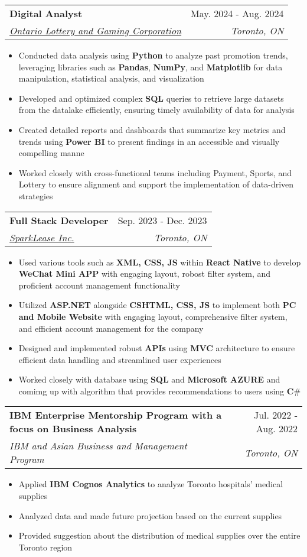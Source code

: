 \documentclass[letterpaper,11pt]{article}
\makeatletter
\newcommand{\resumeItem}[1]{
  \item\small{
    {#1 \vspace{-2pt}}
  }
}
\newcommand{\resumeSubheading}[4]{
  \vspace{-2pt}\item
    \begin{tabular*}{0.97\textwidth}[t]{l@{\extracolsep{\fill}}r}
      \textbf{#1} & #2 \\
      \textit{\small#3} & \textit{\small #4} \\
    \end{tabular*}\vspace{-7pt}
}
\newcommand{\resumeItemListStart}{\begin{itemize}}
\newcommand{\resumeItemListEnd}{\end{itemize}\vspace{-5pt}}
\makeatother
\begin{document}
    \resumeSubheading
      {Digital Analyst}{May. 2024 - Aug. 2024}
      {\href{https://www.olg.ca/en/home.html}{Ontario Lottery and Gaming Corporation}}{Toronto, ON}
      \resumeItemListStart
        \resumeItem{Conducted data analysis using \textbf{Python} to analyze past promotion trends, leveraging libraries such as \textbf{Pandas}, \textbf{NumPy}, and \textbf{Matplotlib} for data manipulation, statistical analysis, and visualization}
        \resumeItem{Developed and optimized complex \textbf{SQL} queries to retrieve large datasets from the datalake efficiently, ensuring timely availability of data for analysis}
        \resumeItem{Created detailed reports and dashboards that summarize key metrics and trends using \textbf{Power BI} to present findings in an accessible and visually compelling manne}
        \resumeItem{Worked closely with cross-functional teams including Payment, Sports, and Lottery to ensure alignment and support the implementation of data-driven strategies}
      \resumeItemListEnd

    \resumeSubheading
      {Full Stack Developer}{Sep. 2023 - Dec. 2023}
      {\href{https://www.sparklease.com/en/Home/Index}{SparkLease Inc.}}{Toronto, ON}
      \resumeItemListStart
        \resumeItem{Used various tools such as \textbf{XML, CSS, JS} within \textbf{React Native} to develop \textbf{WeChat Mini APP} with engaging layout, robost filter system, and proficient account management functionality}
        \resumeItem{Utilized \textbf{ASP.NET} alongside \textbf{CSHTML, CSS, JS} to implement both \textbf{PC and Mobile Website} with engaging layout, comprehensive filter system, and efficient account management for the company}
        \resumeItem{Designed and implemented robust \textbf{APIs} using \textbf{MVC} architecture to ensure efficient data handling and streamlined user experiences}
        \resumeItem{Worked closely with database using \textbf{SQL} and \textbf{Microsoft AZURE} and comimg up with algorithm that provides recommendations to users using \textbf{C$\#$}}
      \resumeItemListEnd

    \resumeSubheading
      {IBM Enterprise Mentorship Program with a focus on Business Analysis}{Jul. 2022 - Aug. 2022}
      {IBM and Asian Business and Management Program}{Toronto, ON}
      \resumeItemListStart
        \resumeItem{Applied \textbf{IBM Cognos Analytics} to analyze Toronto hospitals' medical supplies}
        \resumeItem{Analyzed data and made future projection based on the current supplies}
        \resumeItem{Provided suggestion about the distribution of medical supplies over the entire Toronto region}
    \resumeItemListEnd
\end{document}
